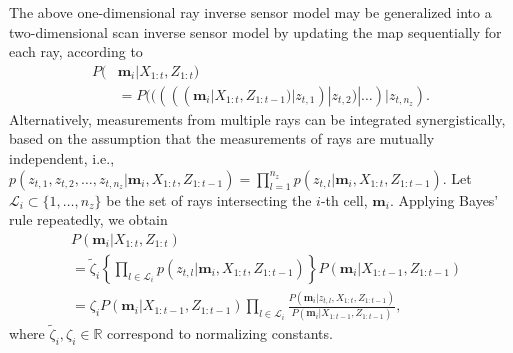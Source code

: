 \documentclass[letterpaper, 10pt, conference]{ieeeconf}
\newcommand{\braces}[1]{\ensuremath{\left\{ #1 \right\}}}
\renewcommand{\Re}{\ensuremath{\mathbb{R}}}
\begin{document}
The above one-dimensional ray inverse sensor model may be generalized into a two-dimensional scan inverse sensor model by updating the map sequentially for each ray, according to
\begin{align}
P(&\mathbf{m}_i|X_{1:t},Z_{1:t})\nonumber\\&%
=P(((((\mathbf{m}_i|X_{1:t},Z_{1:t-1})|z_{t,1})|z_{t,2})|\ldots)|z_{t,n_z}).
\end{align}
Alternatively, measurements from multiple rays can be integrated synergistically, based on the assumption that the measurements of rays are mutually independent, i.e., $p(z_{t,1},z_{t,2},\ldots,z_{t,n_z}|\mathbf{m}_i,X_{1:t},Z_{1:t-1})=\prod_{l=1}^{n_z}p(z_{t,l}|\mathbf{m}_i,X_{1:t},Z_{1:t-1})$.
Let $\mathcal L_i\subset\{1,\ldots, n_z\}$ be the set of rays intersecting the $i$-th cell, $\mathbf{m}_i$. Applying Bayes' rule repeatedly, we obtain
\begin{align}
&P(\mathbf{m}_i|X_{1:t},Z_{1:t})\nonumber\\
&=\tilde\zeta_i\braces{\prod_{l\in\mathcal{L}_i}p(z_{t,l}|\mathbf{m}_i,X_{1:t},Z_{1:t-1})}P(\mathbf{m}_i|X_{1:t-1},Z_{1:t-1})\nonumber\\
%
&=
\zeta_i P(\mathbf{m}_i|X_{1:t-1},Z_{1:t-1})%
\prod_{l\in\mathcal{L}_i}\frac{P(\mathbf{m}_i|z_{t,l},X_{1:t},Z_{1:t-1})}{P(\mathbf{m}_i|X_{1:t-1},Z_{1:t-1})},
\label{eqn:ThirdBayesRule}
\end{align}
where $\tilde\zeta_i,\zeta_i\in\Re$ correspond to normalizing constants.%
\end{document}
